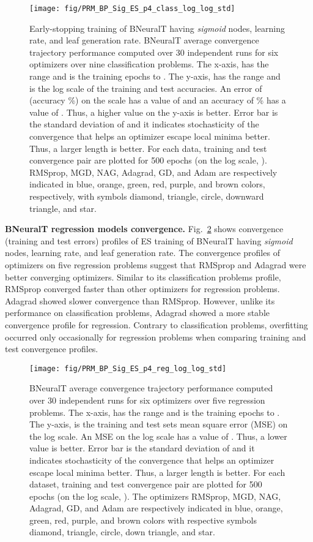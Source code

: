 \documentclass[11pt,a4paper]{article}
\begin{document}
    \begin{figure}
        \centering
        \texttt{[image: fig/PRM\_BP\_Sig\_ES\_p4\_class\_log\_log\_std]}
        \caption{Early-stopping training of BNeuralT having \textit{sigmoid} nodes,  learning rate, and  leaf generation rate. BNeuralT average convergence trajectory performance computed over 30 independent runs for six optimizers over nine classification problems. The x-axis,  has the range  and is the training epochs  to . The y-axis,  has the range  and is the log scale of the training and test  accuracies. An error of  (accuracy \%) on the   scale has a value of  and an accuracy of \% has a value of . Thus, a higher value on the y-axis is better. Error bar is the standard deviation of  and it indicates stochasticity of the convergence that helps an optimizer escape local minima better. Thus, a larger length is better. For each data, training and test convergence pair are plotted for 500 epochs (on the log scale, ). RMSprop, MGD, NAG, Adagrad, GD, and Adam are respectively indicated in blue, orange, green, red, purple, and brown colors, respectively, with symbols diamond, triangle, circle, downward triangle, and star.}\label{fig:BneuralT_class_covg}
    \end{figure}
    
    \textbf{BNeuralT regression models convergence.} Fig.~\ref{fig:BneuralT_reg_all} shows convergence (training and test errors) profiles of ES training of BNeuralT having \textit{sigmoid} nodes,  learning rate, and  leaf generation rate.  The convergence profiles of optimizers on five regression problems suggest that RMSprop and Adagrad were better converging optimizers. Similar to its classification problems profile, RMSprop converged faster than other optimizers for regression problems. Adagrad showed slower convergence than RMSprop. However, unlike its performance on classification problems, Adagrad showed a more stable convergence profile for regression. Contrary to classification problems, overfitting occurred only occasionally for  regression problems when comparing training and test convergence profiles.
\begin{figure}
        \centering
\texttt{[image: fig/PRM\_BP\_Sig\_ES\_p4\_reg\_log\_log\_std]}
        \caption{BNeuralT average convergence trajectory performance computed over 30 independent runs for six optimizers over five regression problems. The x-axis,  has the range  and is the training epochs  to . The y-axis,  is the training and test sets mean square error (MSE) on the log scale. An MSE  on the log scale has a value of . Thus, a lower value is better. Error bar is the standard deviation of  and it indicates stochasticity of the convergence that helps an optimizer escape local minima better. Thus, a larger length is better. For each dataset, training and test convergence pair are plotted for 500 epochs (on the log scale, ). The optimizers RMSprop, MGD, NAG, Adagrad, GD, and Adam are respectively indicated in blue, orange, green, red, purple, and brown colors with respective symbols diamond, triangle, circle, down triangle, and star.}\label{fig:BneuralT_reg_all}
    \end{figure} 
    
\end{document}
